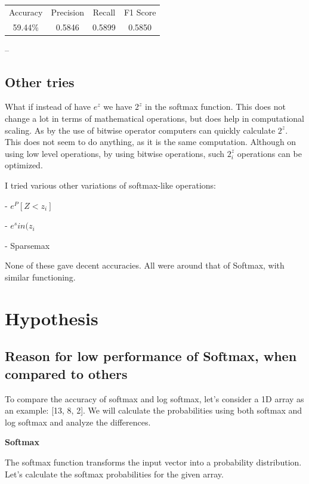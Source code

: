 \documentclass{article}
\begin{document}
\begin{center}
\begin{tabular}{ |c|c|c|c| } 
 \hline
 Accuracy & Precision & Recall & F1 Score \\ 
 59.44\% & 0.5846 & 0.5899 & 0.5850 \\
 \hline
\end{tabular}
\end{center}

--



\subsection{Other tries}

What if instead of have \(e^z\) we have \(2^z\) in the softmax function. This does not change a lot in terms of mathematical operations, but does help in computational scaling. As by the use of bitwise operator computers can quickly calculate \(2^z\). This does not seem to do anything, as it is the same computation. Although on using low level operations, by using bitwise operations, such \(2^z_i\) operations can be optimized.

I tried various other variations of softmax-like operations: 

- \(e^P[Z<z_i]\)

- \(e^sin(z_i\)

- Sparsemax\cite{sparsemax}

None of these gave decent accuracies. All were around that of Softmax, with similar functioning.



\section{Hypothesis}

\subsection{Reason for low performance of Softmax, when compared to others}

To compare the accuracy of softmax and log softmax, let's consider a 1D array as an example: [13, 8, 2]. We will calculate the probabilities using both softmax and log softmax and analyze the differences.

\textbf{Softmax}

The softmax function transforms the input vector into a probability distribution. Let's calculate the softmax probabilities for the given array.
\end{document}
